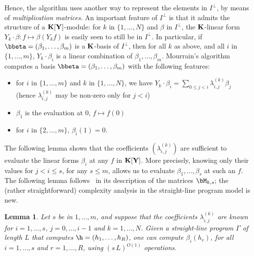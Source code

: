 \documentclass[12pt]{article}
\newtheorem{lemma}[definition]{Lemma}
\begin{document}
Hence, the algorithm uses another way to represent the elements in
$I^{\perp}$, by means of {\em multiplication matrices}. An important
feature of $I^{\perp}$ is that it admits the structure of a
$\mathbf{K}[\mathbf{Y}]$-module: for $k$ in $\{1,\dots,N\}$ and $\beta$ in
$I^{\perp}$, the $\mathbf{K}$-linear form $Y_k \cdot \beta: f \mapsto
\beta(Y_k f)$ is easily seen to still be in $I^{\perp}$.  In
particular, if $\bbeta=(\beta_1,\dots,\beta_m)$ is a $\mathbf{K}$-basis of
$I^{\perp}$, then for all $k$ as above, and all $i$ in
$\{1,\dots,m\}$, $Y_k \cdot \beta_i$ is a linear combination of
$\beta_1,\dots,\beta_m$. Mourrain's algorithm computes a
basis $\bbeta=(\beta_1,\dots,\beta_m)$ with the following features:
\begin{itemize}
\item for $i$ in $\{1,\dots,m\}$ and $k$ in $\{1,\dots,N\}$, we have
  $Y_k \cdot \beta_i=\sum_{0 \le j < i} \lambda^{(k)}_{i,j} \beta_j$
  (hence $\lambda^{(k)}_{i,j}$ may be non-zero 
  only for $j<i$)
\item $\beta_1$ is the evaluation at $0$, $f \mapsto f(0)$
\item for $i$ in $\{2,\dots,m\}$, $\beta_i(1)=0$.
\end{itemize}
The following lemma shows that the coefficients $(\lambda^{(k)}_{i,j})$
are sufficient to evaluate  the linear forms $\beta_i$ at any $f$ in
$\mathbf{K}[\mathbf{Y}]$. More precisely, knowing only their values for $j < i \le s$,
for any $s \le m$, allows us to evaluate $\beta_1,\dots,\beta_s$ at such an $f$.
The following lemma follows~\cite{Mourrain97} in its description
of the matrices $\bM_{k,s}$; the (rather straightforward) complexity analysis 
in the straight-line program model is new.
\begin{lemma}\label{lemma:evalbeta}
   Let $s$ be in $1,\dots,m$, and suppose that the coefficients
  $\lambda^{(k)}_{i,j}$ are known for $i=1,\dots,s$, $j=0,\dots,i-1$
  and $k=1,\dots,N$. Given a straight-line program $\Gamma$ of length
  $L$ that computes $\h=(h_1,\dots,h_R)$, one can compute
  $\beta_i(h_r)$, for all $i=1,\dots,s$ and $r=1,\dots,R$, using
  $(s\,L)^{O(1)}$ operations.
\end{lemma}
\end{document}

